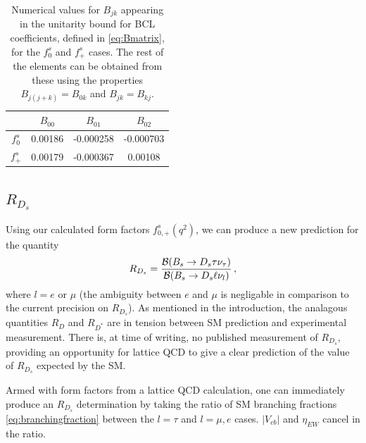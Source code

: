 \begin{table}[htb!]
  \begin{center}
    \begin{tabular}{c c c c}
      \hline
      & $B_{00}$ & $B_{01}$ & $B_{02}$ \\ [0.5ex]
      \hline
      $f^s_0$ & 0.00186 & -0.000258 & -0.000703 \\ [0.5ex]
      $f^s_+$ & 0.00179 & -0.000367 & 0.00108 \\ [0.5ex]
      \hline
    \end{tabular}
  \end{center}
  \caption{Numerical values for $B_{jk}$ appearing in the unitarity bound for BCL coefficients, defined in \eqref{eq:Bmatrix}, for the $f^s_0$ and $f^s_+$ cases. The rest of the elements can be obtained from these using the properties $B_{j(j+k)}=B_{0k}$ and $B_{jk}=B_{kj}$. \label{tab:Bmatrix}}
\end{table}


\subsection{$R_{D_s}$}


Using our calculated form factors $f^s_{0,+}(q^2)$, we can produce a new prediction for the quantity
\begin{align}
  R_{D_s} = {\mathcal{B}(B_s\to D_s \tau \nu_{\tau})\over
    \mathcal{B}(B_s\to D_s \ell \nu_{l})}\,,
\end{align}
where $l=e$ or $\mu$ (the ambiguity between $e$ and $\mu$ is negligable in comparison to the current precision on $R_{D_s}$). As mentioned in the introduction, the analagous quantities $R_{D}$ and $R_{D^*}$ are in tension between SM prediction and experimental measurement. There is, at time of writing, no published measurement of $R_{D_s}$, providing an opportunity for lattice QCD to give a clear prediction of the value of $R_{D_s}$ expected by the SM.

Armed with form factors from a lattice QCD calculation, one can immediately produce an $R_{D_s}$ determination by taking the ratio of SM branching fractions \eqref{eq:branchingfraction} between the $l=\tau$ and $l=\mu,e$ cases. $|V_{cb}|$ and $\eta_{EW}$ cancel in the ratio.

